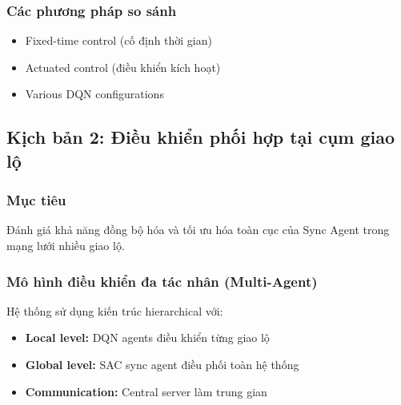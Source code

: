 \subsubsection{Các phương pháp so sánh}
\begin{itemize}
    \item Fixed-time control (cố định thời gian)

    \item Actuated control (điều khiển kích hoạt)

    \item Various DQN configurations
\end{itemize}

\subsection{Kịch bản 2: Điều khiển phối hợp tại cụm giao lộ}
\subsubsection{Mục tiêu}
Đánh giá khả năng đồng bộ hóa và tối ưu hóa toàn cục của Sync Agent trong mạng lưới
nhiều giao lộ.

\subsubsection{Mô hình điều khiển đa tác nhân (Multi-Agent)}
Hệ thống sử dụng kiến trúc hierarchical với:
\begin{itemize}
    \item \textbf{Local level:} DQN agents điều khiển từng giao lộ

    \item \textbf{Global level:} SAC sync agent điều phối toàn hệ thống

    \item \textbf{Communication:} Central server làm trung gian
\end{itemize}
\newpage
